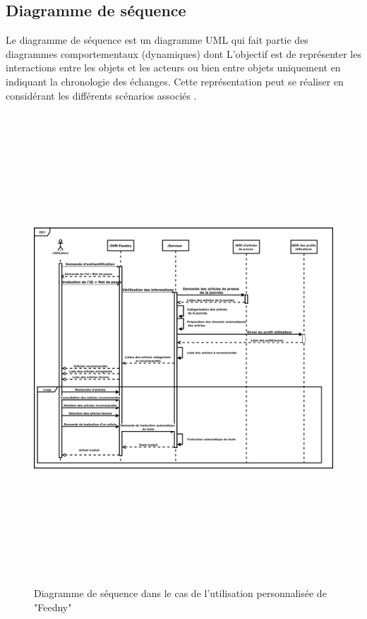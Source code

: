 \subsection{Diagramme de séquence}
Le diagramme de séquence est un diagramme UML qui fait partie des diagrammes comportementaux (dynamiques) dont L'objectif est de représenter les interactions entre les objets et les acteurs ou bien entre objets uniquement en indiquant la chronologie des échanges. Cette représentation peut se réaliser en considérant les différents scénarios associés \cite{UML}.
\begin{figure}[H]
    \centering
    \includegraphics[height=500pt,width=425pt]{img/chapter3/diagseqperso.png}
    \caption{Diagramme de séquence dans le cas de l'utilisation personnalisée de "Feedny"}
\end{figure}

